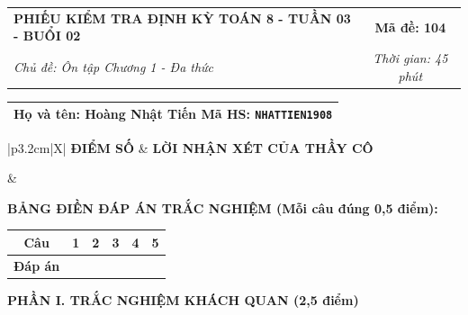 \documentclass[12pt,a4paper]{article}
\begin{document}
\newpage


\noindent
\begin{tabularx}{\linewidth}{|X|c|}
\hline
\textbf{PHIẾU KIỂM TRA ĐỊNH KỲ TOÁN 8 - TUẦN 03 - BUỔI 02} & \textbf{Mã đề: 104} \\
\textit{Chủ đề: Ôn tập Chương 1 - Đa thức} & \textit{Thời gian: 45 phút} \\
\hline
\end{tabularx}

\vspace{1mm}

\noindent
\begin{tabularx}{\linewidth}{|X|}
\hline
\rule[-2mm]{0pt}{7.5mm}\textbf{Họ và tên:} \textbf{\large Hoàng Nhật Tiến} \hfill \textbf{Mã HS:} \texttt{NHATTIEN1908} \quad \\
\hline
\end{tabularx}

\vspace{1mm}

\noindent
\begin{tabularx}{\linewidth}{|p{3.2cm}|X|}
\hline
\centering\textbf{ĐIỂM SỐ} & \centering\textbf{LỜI NHẬN XÉT CỦA THẦY CÔ} \tabularnewline
\hline
\rule{0pt}{1.3cm} & \tabularnewline
\hline
\end{tabularx}

\vspace{1.2mm}

\noindent\textbf{BẢNG ĐIỀN ĐÁP ÁN TRẮC NGHIỆM (Mỗi câu đúng 0,5 điểm):}
\vspace{0.8mm}

\noindent
\renewcommand{\arraystretch}{1.35}
\begin{tabularx}{\linewidth}{|c|*{5}{>{\centering\arraybackslash}X|}}
\hline
\textbf{Câu} & \textbf{1} & \textbf{2} & \textbf{3} & \textbf{4} & \textbf{5} \\
\hline
\textbf{Đáp án} & & & & & \\
\hline
\end{tabularx}
\renewcommand{\arraystretch}{1.0}

\vspace{1.5mm}

\noindent\textbf{\large PHẦN I. TRẮC NGHIỆM KHÁCH QUAN (2,5 điểm)}
\vspace{1mm}
\end{document}

